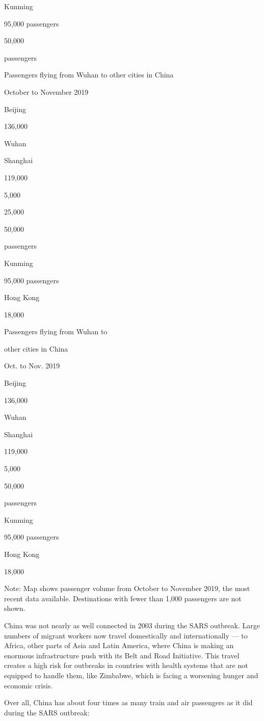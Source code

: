 Kunming

95,000 passengers

50,000

passengers

Passengers flying from Wuhan to other cities in China

October to November 2019

Beijing

136,000

Wuhan

Shanghai

119,000

5,000

25,000

50,000

passengers

Kunming

95,000 passengers

Hong Kong

18,000

Passengers flying from Wuhan to

other cities in China

Oct. to Nov. 2019

Beijing

136,000

Wuhan

Shanghai

119,000

5,000

50,000

passengers

Kunming

95,000 passengers

Hong Kong

18,000

Note: Map shows passenger volume from October to November 2019, the most
recent data available. Destinations with fewer than 1,000 passengers are
not shown.

China was not nearly as well connected in 2003 during the SARS outbreak.
Large numbers of migrant workers now travel domestically and
internationally --- to Africa, other parts of Asia and Latin America,
where China is making an enormous infrastructure push with its Belt and
Road Initiative. This travel creates a high risk for outbreaks in
countries with health systems that are not equipped to handle them, like
Zimbabwe, which is facing a worsening hunger and economic crisis.

Over all, China has about four times as many train and air passengers as
it did during the SARS outbreak:

